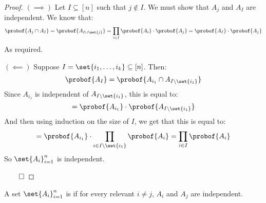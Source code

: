\begin{proof}

	$(\boldsymbol\implies)$ Let $I\subseteq[n]$ such that $j\notin I$.
	We must show that $A_j$ and $A_I$ are independent.
	We know that:
	\[ \probof{A_j\cap A_I} = \probof{A_{I\cup\set{j}}} = \prod_{i\in I}\probof{A_i} \cdot\probof{A_j} =
	   \probof{A_I}\cdot\probof{A_j} \]
	As required.

	$(\boldsymbol\impliedby)$ Suppose $I=\set{i_1,\dots,i_k}\subseteq[n]$.
	Then:
	\[ \probof{A_I} = \probof{A_{i_1}\cap A_{I\setminus\set{i_1}}} \]
	Since $A_{i_1}$ is independent of $A_{I\setminus\set{i_1}}$, this is equal to:
	\[ = \probof{A_{i_1}} \cdot \probof{A_{I\setminus\set{i_1}}} \]
	And then using induction on the size of $I$, we get that this is equal to:
	\[ = \probof{A_{i_1}} \cdot \prod_{i\in I\setminus\set{i_1}}\probof{A_i} = \prod_{i\in I}\probof{A_i} \]
	So $\set{A_i}_{i=1}^n$ is independent.

\hfill$\qed$

\end{proof}

\begin{defn*}

	A set $\set{A_i}_{i=1}^n$ is  if for every relevant $i\neq j$, $A_i$ and $A_j$ are
	independent.

\end{defn*}

